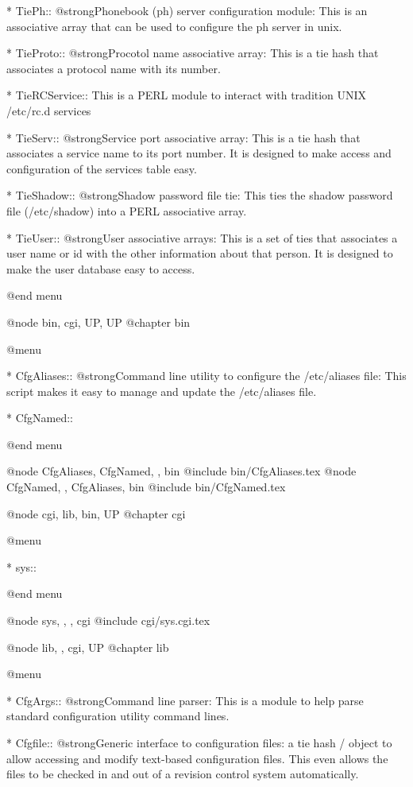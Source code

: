 * TiePh::	@strong{Phonebook (ph) server configuration module:} This is an associative array that can be used to configure the ph server in unix. 

* TieProto::	@strong{Procotol name associative array:} This is a tie hash that associates a protocol name with its number. 

* TieRCService::	This is a PERL module to interact with tradition UNIX /etc/rc.d services 

* TieServ::	@strong{Service port associative array:} This is a tie hash that associates a service name to its port number.  It is designed to make access and configuration of the services table easy. 

* TieShadow::	@strong{Shadow password file tie:}  This ties the shadow password file (/etc/shadow) into a PERL associative array. 

* TieUser::	@strong{User associative arrays:} This is a set of ties that associates a user name or id with the other information about that person.  It is designed to make the user database easy to access. 

@end menu

@node bin, cgi, UP, UP
@chapter bin


@menu

* CfgAliases::	@strong{Command line utility to configure the /etc/aliases file:}  This script makes it easy to manage and update the /etc/aliases file. 

* CfgNamed::	

@end menu

@node CfgAliases,	CfgNamed,	,	bin
@include bin/CfgAliases.tex
@node CfgNamed,	,	CfgAliases,	bin
@include bin/CfgNamed.tex

@node cgi, lib, bin, UP
@chapter cgi


@menu

* sys::	

@end menu

@node sys,	,	,	cgi
@include cgi/sys.cgi.tex

@node lib, , cgi, UP
@chapter lib


@menu

* CfgArgs::	@strong{Command line parser:} This is a module to help parse standard configuration utility command lines. 

* Cfgfile::	@strong{Generic interface to configuration files:} a tie hash / object to allow accessing and modify text-based configuration files.  This even allows the files to be checked in and out of a revision control system automatically. 

